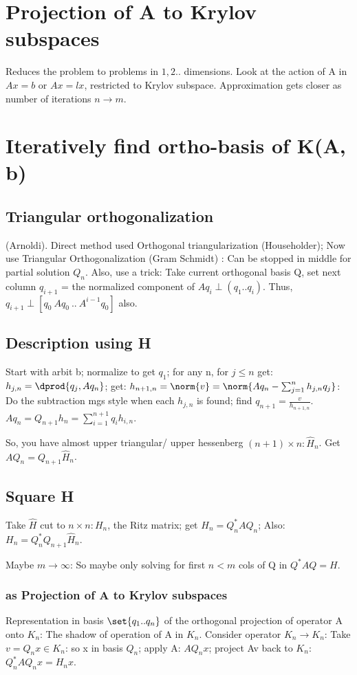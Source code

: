 \documentclass[oneside, article]{memoir}
\begin{document}
\section{Projection of A to Krylov subspaces}
Reduces the problem to problems in $1, 2 ..$ dimensions. Look at the action of A in $Ax=b$ or $Ax = lx$, restricted to Krylov subspace. Approximation gets closer as number of iterations $n \to m$.

\section{Iteratively find ortho-basis of K(A, b)}
\subsection{Triangular orthogonalization}
(Arnoldi).
Direct method used Orthogonal triangularization (Householder); Now use Triangular Orthogonalization (Gram Schmidt) : Can be stopped in middle for partial solution $Q_n$. Also, use a trick: Take current orthogonal basis Q, set next column $q_{i+1}$ = the normalized component of $Aq_i \perp (q_1 .. q_i)$. Thus, $q_{i+1} \perp [q_0\ Aq_0\ ..\ A^{i - 1}q_0]$ also.

\subsection{Description using H}
Start with arbit b; normalize to get $q_{1}$; for any n, for $j \leq n$ get: $h_{j,n} = \dprod{q_{j},Aq_{n}}$; get: $h_{n+1,n} = \norm{v} = \norm{Aq_{n} - \sum_{j=1}^{n}h_{j,n}q_{j}}$: Do the subtraction mgs style when each $h_{j,n}$ is found; find $q_{n+1} = \frac{v}{h_{n+1,n}}$. $Aq_{n} = Q_{n+1}h_{n} = \sum_{i=1}^{n+1} q_{i}h_{i, n}$.

So, you have almost upper triangular/ upper hessenberg $(n+1)\times n: \hat{H}_n$. Get $AQ_{n} = Q_{n+1}\hat{H}_{n}$.

\subsection{Square H}
Take $\hat{H}$ cut to $n\times n: H_{n}$, the Ritz matrix; get $H_{n} = Q_{n}^{*}AQ_{n}$;  Also: $H_{n} = Q_{n}^{*}Q_{n+1}\hat{H}_{n}$.

 Maybe $m \to \infty$: So maybe only solving for first $n<m$ cols of Q in $Q^{*}AQ=H$.

\subsubsection{ as Projection of A to Krylov subspaces}
Representation in basis $\set{q_{1} .. q_{n}}$ of the orthogonal projection of operator A onto $K_{n}$: The shadow of operation of A in $K_{n}$. Consider operator $K_{n} \to K_{n}$: Take $v = Q_{n}x \in K_{n}$: so x in basis $Q_n$; apply A: $A Q_n x$; project Av back to $K_{n}$: $Q_n^{*} A Q_n x = H_n x$.
\end{document}
